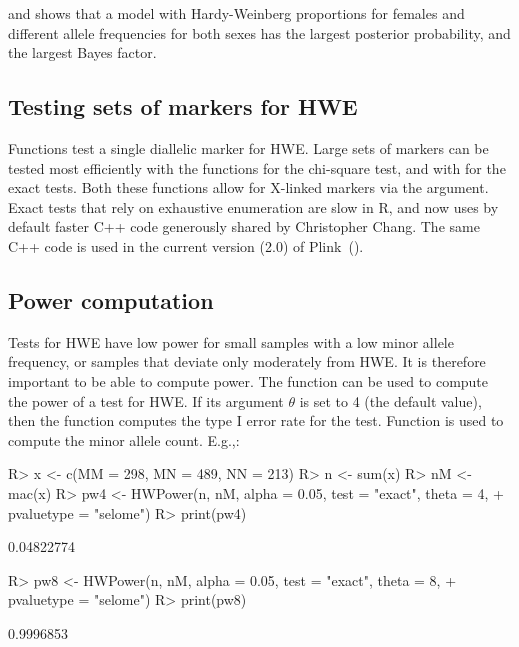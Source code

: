 \documentclass[nojss]{jss}
\begin{document}
and shows that a model with Hardy-Weinberg proportions for females and different allele frequencies for both sexes has the 
largest posterior probability, and the largest Bayes factor.

\subsection{Testing  sets of markers for HWE}
\label{subsec:testingset}

Functions  test a single diallelic marker for HWE. 
Large sets of markers can be tested most efficiently with the functions  for the
chi-square test, and with  for the exact tests. Both these functions allow for
X-linked markers via the  argument. Exact tests that rely on exhaustive enumeration are slow in R, and  now uses by default faster C++ code generously shared by Christopher Chang. The same C++ code is used in the current version (2.0) of Plink~(\cite{Purcell}).

\subsection{Power computation}
\label{subsec:powercomp}

Tests for HWE have low power for small samples with a low minor allele
frequency, or samples that deviate only moderately from HWE. It is
therefore important to be able to compute power. The function
 can be used to compute the power of a test for HWE. If
its argument $\theta$ is set to 4 (the default value), then the
function computes the type I error rate for the test. Function
 is used to compute the minor allele count. E.g.,:
%
\begin{Schunk}
\begin{Sinput}
R> x <- c(MM = 298, MN = 489, NN = 213)
R> n <- sum(x)
R> nM <- mac(x) 
R> pw4 <- HWPower(n, nM, alpha = 0.05, test = "exact", theta = 4, 
+                pvaluetype = "selome")
R> print(pw4)
\end{Sinput}
\begin{Soutput}
[1] 0.04822774
\end{Soutput}
\begin{Sinput}
R> pw8 <- HWPower(n, nM, alpha = 0.05, test = "exact", theta = 8, 
+                pvaluetype = "selome")
R> print(pw8)
\end{Sinput}
\begin{Soutput}
[1] 0.9996853
\end{Soutput}
\end{Schunk}
\end{document}
